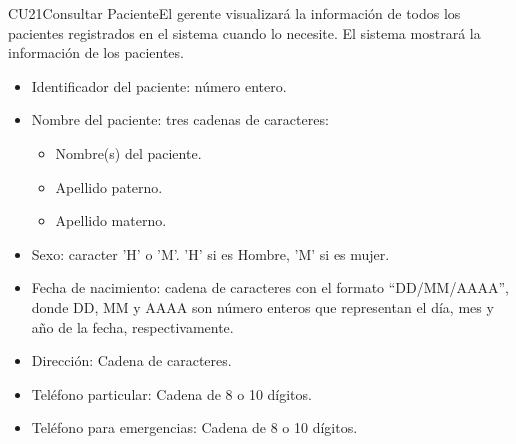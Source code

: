 \begin{UseCase}{CU21}{Consultar Paciente}{El gerente visualizará la información de todos los pacientes registrados en el sistema cuando lo necesite. El sistema mostrará la información de los pacientes.}
{\begin{itemize}
	        \begin{itemize}
	        	\item Identificador del paciente: número entero.
				\item Nombre del paciente: tres cadenas de caracteres:
				\begin{itemize}
					\item Nombre(s) del paciente.
					\item Apellido paterno.
					\item Apellido materno.
		        \end{itemize}
		        \item Sexo: caracter 'H' o 'M'. 'H' si es Hombre, 'M' si es mujer.
		        \item Fecha de nacimiento: cadena de caracteres con el formato ``DD/MM/AAAA'', donde DD, MM y AAAA son número enteros que representan el día, mes y año de la fecha, respectivamente.
		        \item Dirección: Cadena de caracteres.
		        \item Teléfono particular: Cadena de 8 o 10 dígitos.
		        \item Teléfono para emergencias: Cadena de 8 o 10 dígitos.
		    \end{itemize}   
		\end{itemize}
	}
	

\end{UseCase}
